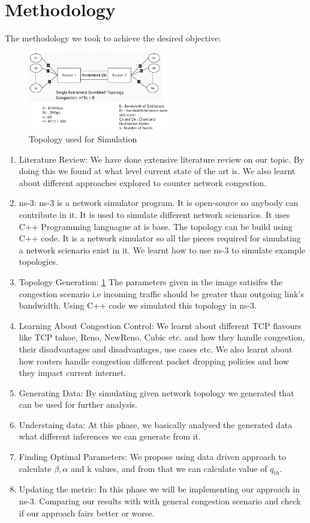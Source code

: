 \section{Methodology}
The methodology we took to achieve the desired objective:
\begin{figure}[h]
    \centering
    \includegraphics[width=0.55\textwidth]{./images/topology.png}
    \caption{\label{fig:myfig2} Topology used for Simulation}
\end{figure}
\begin{enumerate}
    \item Literature Review: We have done extensive literature review on our topic. By doing this we found at what level current state of the art is. We also learnt about different approaches explored to counter network congestion.
    \item ns-3: ns-3 is a network simulator program. It is open-source so anybody can contribute in it. It is used to simulate different network scienarios. It uses C++ Programming languague at is base. The topology can be build using C++ code. It is a network simulator so all the pieces required for simulating a network scienario exist in it. We learnt how to use ns-3 to simulate example topologies.
    \item Topology Generation: \ref{fig:myfig2} The parameters given in the image satisifes the congestion scenario i.e incoming traffic should be greater than outgoing link's bandwidth. Using C++ code we simulated this topology in ns-3.
    \item Learning About Congestion Control: We learnt about different TCP flavours like TCP tahoe, Reno, NewReno, Cubic etc. and how they handle congestion, their disadvantages and disadvantages, use cases etc. We also learnt about how routers handle congestion different packet dropping policies and how they impact current internet.
    \item Generating Data: By simulating given network topology we generated that can be used for further analysis.
    \item Understaing data: At this phase, we basically analysed the generated data what different inferences we can generate from it.
    \item Finding Optimal Parameters: We propose using data driven approach to calculate \( \beta, \alpha \) and k values, and from that we can calculate value of \( q_{th} \). 
    \item Updating the metric: In this phase we will be implementing our approach in ns-3. Comparing our results with with general congestion scenario and check if our approach fairs better or worse.
\end{enumerate}

